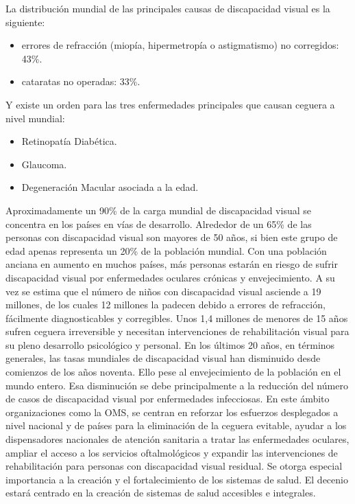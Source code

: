 La distribuci\'on mundial de las principales causas de discapacidad visual es la siguiente:
\begin{itemize}
\item errores de refracci\'on (miop\'ia, hipermetrop\'ia o astigmatismo) no corregidos: 43\%.
\item cataratas no operadas: 33\%.
\end{itemize}
Y existe un orden para las tres enfermedades principales que causan ceguera a nivel mundial:
\begin{itemize}
\item Retinopat\'ia Diab\'etica.
\item Glaucoma.
\item Degeneraci\'on Macular asociada a la edad.
\end{itemize}
Aproximadamente un 90\% de la carga mundial de discapacidad visual se concentra en los pa\'ises en v\'ias de desarrollo. Alrededor de un 65\% de las personas con discapacidad visual son mayores de 50 años, si bien este grupo de edad apenas representa un 20\% de la poblaci\'on mundial. Con una poblaci\'on anciana en aumento en muchos pa\'ises, m\'as personas estar\'an en riesgo de sufrir discapacidad visual por enfermedades oculares cr\'onicas y envejecimiento.
A su vez se estima que el n\'umero de niños con discapacidad visual asciende a 19 millones, de los cuales 12 millones la padecen debido a errores de refracci\'on, f\'acilmente diagnosticables y corregibles. Unos 1,4 millones de menores de 15 años sufren ceguera irreversible y necesitan intervenciones de rehabilitaci\'on visual para su pleno desarrollo psicol\'ogico y personal.
En los \'ultimos 20 años, en t\'erminos generales, las tasas mundiales de discapacidad visual han disminuido desde comienzos de los años noventa. Ello pese al envejecimiento de la poblaci\'on en el mundo entero. Esa disminuci\'on se debe principalmente a la reducci\'on del n\'umero de casos de discapacidad visual por enfermedades infecciosas.
En este \'ambito organizaciones como la OMS, se centran en reforzar los esfuerzos desplegados a nivel nacional y de pa\'ises para la eliminaci\'on de la ceguera evitable, ayudar a los dispensadores nacionales de atenci\'on sanitaria a tratar las enfermedades oculares, ampliar el acceso a los servicios oftalmol\'ogicos y expandir las intervenciones de rehabilitaci\'on para personas con discapacidad visual residual. Se otorga especial importancia a la creaci\'on y el fortalecimiento de los sistemas de salud. El decenio estar\'a centrado en la creaci\'on de sistemas de salud accesibles e integrales.

